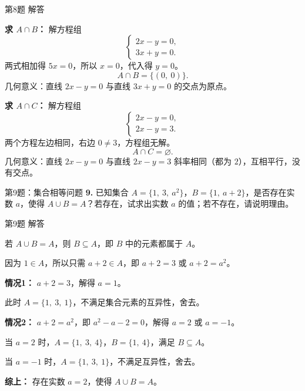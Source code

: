 \documentclass[10pt,aspectratio=169,serif]{beamer}
\begin{document}
\begin{frame}[t]{第8题 解答}
\begin{tcolorbox}[colback=orange!10,colframe=orange,title=\textbf{解}]
\textbf{求 $A \cap B$：} 解方程组
\[
\begin{cases}
2x - y = 0, \\
3x + y = 0.
\end{cases}
\]
两式相加得 $5x = 0$，所以 $x = 0$，代入得 $y = 0$。
\[
A \cap B = \{(0,\ 0)\}.
\]
几何意义：直线 $2x - y = 0$ 与直线 $3x + y = 0$ 的交点为原点。

\vspace{0.8em}
\textbf{求 $A \cap C$：} 解方程组
\[
\begin{cases}
2x - y = 0, \\
2x - y = 3.
\end{cases}
\]
两个方程左边相同，右边 $0 \neq 3$，方程组无解。
\[
A \cap C = \varnothing.
\]
几何意义：直线 $2x - y = 0$ 与直线 $2x - y = 3$ 斜率相同（都为 $2$），互相平行，没有交点。
\end{tcolorbox}
\end{frame}

\begin{frame}[t]{第9题：集合相等问题}
\textbf{9.} 已知集合 $A = \{1,\ 3,\ a^2\}$，$B = \{1,\ a + 2\}$，是否存在实数 $a$，使得 $A \cup B = A$？若存在，试求出实数 $a$ 的值；若不存在，请说明理由。
\end{frame}

\begin{frame}[t]{第9题 解答}
\begin{tcolorbox}[colback=orange!10,colframe=orange,title=\textbf{解}]
若 $A \cup B = A$，则 $B \subseteq A$，即 $B$ 中的元素都属于 $A$。

\vspace{0.5em}
因为 $1 \in A$，所以只需 $a + 2 \in A$，即 $a + 2 = 3$ 或 $a + 2 = a^2$。

\vspace{0.8em}
\textbf{情况1：} $a + 2 = 3$，解得 $a = 1$。

\vspace{0.3em}
此时 $A = \{1,\ 3,\ 1\}$，不满足集合元素的互异性，舍去。

\vspace{0.8em}
\textbf{情况2：} $a + 2 = a^2$，即 $a^2 - a - 2 = 0$，解得 $a = 2$ 或 $a = -1$。

\vspace{0.3em}
当 $a = 2$ 时，$A = \{1,\ 3,\ 4\}$，$B = \{1,\ 4\}$，满足 $B \subseteq A$。

\vspace{0.3em}
当 $a = -1$ 时，$A = \{1,\ 3,\ 1\}$，不满足互异性，舍去。

\vspace{0.8em}
\textbf{综上：} 存在实数 $a = 2$，使得 $A \cup B = A$。
\end{tcolorbox}
\end{frame}
\end{document}
